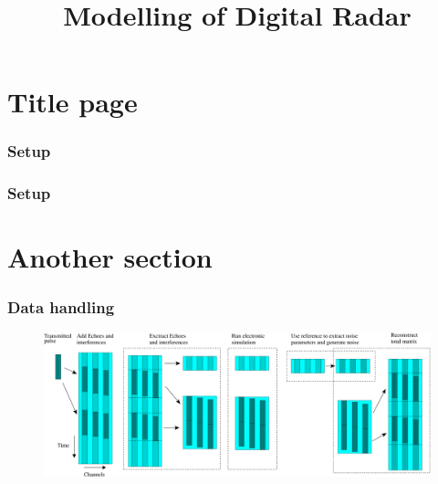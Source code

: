 \documentclass[11pt]{beamer} %
\title{Modelling of Digital Radar}
\author[Albin Jonasson Svärdsby]{} %
\institute{Chalmers University of Technology}
\begin{document}

\section{Title page} %
\begin{frame}[plain]
 \titlepage
\end{frame}

\begin{frame}
\frametitle{Setup}
 \begin{figure}[h!]\centering
            \scalebox{0.7}{
                
            }
        \end{figure}
\end{frame}


\begin{frame}
\frametitle{Setup}
 \begin{figure}[h!]\centering
            \scalebox{0.7}{
                
            }
        \end{figure}
\end{frame}



\section{Another section}
\begin{frame}
 \frametitle{Data handling}

\begin{figure}
\includegraphics[width=1.05\textwidth]{figures/Setup/channelDataTreatment.pdf}
\end{figure}

\end{frame}
\end{document}
